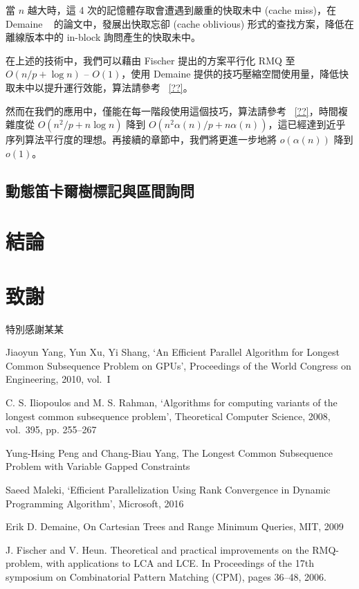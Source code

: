 \documentclass{gapd}
\begin{document}
當 $n$ 越大時，這 4 次的記憶體存取會遭遇到嚴重的快取未中 (cache miss)，在 Demaine ~\cite{demaine} 的論文中，發展出快取忘卻 (cache oblivious) 形式的查找方案，降低在離線版本中的 in-block 詢問產生的快取未中。

在上述的技術中，我們可以藉由 Fischer 提出的方案平行化 RMQ 至 $O(n / p + \log n)$ -- $O(1)$，使用 Demaine 提供的技巧壓縮空間使用量，降低快取未中以提升運行效能，算法請參考 ~\ref{??}。

然而在我們的應用中，僅能在每一階段使用這個技巧，算法請參考 ~\ref{??}，時間複雜度從 $O(n^2 / p + n \log n)$ 降到 $O(n^2 \alpha(n) / p + n \alpha(n))$，這已經達到近乎序列算法平行度的理想。再接續的章節中，我們將更進一步地將 $o(\alpha(n))$ 降到 $o(1)$。

\subsection{動態笛卡爾樹標記與區間詢問}

\section{結論}
\label{sec:Conclusion}

\section*{致謝}

特別感謝某某

\begin{thebibliography}{4}

 Jiaoyun Yang, Yun Xu, Yi Shang, `An Efficient Parallel Algorithm for Longest Common Subsequence Problem on GPUs', Proceedings of the World Congress on Engineering, 2010, vol.~I 

 C. S. Iliopoulos and M. S. Rahman, `Algorithms for computing variants of the longest common subsequence problem', Theoretical Computer Science, 2008, vol.~395, pp. 255--267

 Yung-Hsing Peng and Chang-Biau Yang, The Longest Common Subsequence Problem with Variable Gapped Constraints

 Saeed Maleki, `Efficient Parallelization Using Rank Convergence in Dynamic Programming Algorithm', Microsoft, 2016

 Erik D. Demaine, On Cartesian Trees and Range Minimum Queries, MIT, 2009

 J. Fischer and V. Heun. Theoretical and practical improvements on the RMQ- problem, with applications to LCA and LCE. In Proceedings of the 17th symposium on Combinatorial Pattern Matching (CPM), pages 36–48, 2006.

\end{thebibliography}

\end{document}
